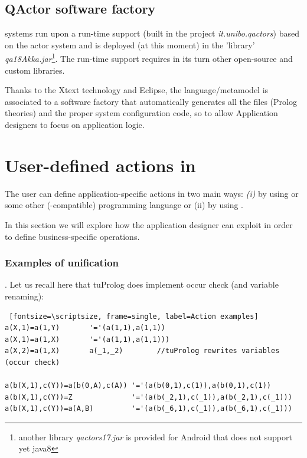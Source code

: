 \subsection{QActor software factory} 

\qa{} systems run upon a run-time support  (built in the project \textit{it.unibo.qactors}) based on the \akka{} actor system and is deployed (at this moment) in the 'library' \textit{qa18Akka.jar}\footnote{another library \textit{qactors17.jar} is provided for Android that does not support yet java8}. The \qa{} run-time support requires in its turn other open-source and custom libraries. 

Thanks to the Xtext technology and Eclipse, the \qa{} language/metamodel is associated to a software factory that automatically generates all the files (Prolog theories) and the proper system configuration code, so to allow Application designers to focus on application logic.


\newpage 


\newpage 
 \section{User-defined actions in \prolog}
 
The user can define application-specific actions in two main ways: \textit{(i)} by using \java{} or some other (\java{}-compatible) programming language or (ii) by using \tuprolog{}.
 
In this section we will explore how the application designer can exploit \tuprolog{} in order to define business-specific operations.

\subsubsection{Examples of unification}.
Let us recall here that tuProlog does implement occur check (and variable renaming):

\begin{Verbatim} [fontsize=\scriptsize, frame=single, label=Action examples]
a(X,1)=a(1,Y)       '='(a(1,1),a(1,1))
a(X,1)=a(1,X)       '='(a(1,1),a(1,1)))
a(X,2)=a(1,X)       a(_1,_2)		//tuProlog rewrites variables (occur check)

a(b(X,1),c(Y))=a(b(0,A),c(A)) '='(a(b(0,1),c(1)),a(b(0,1),c(1))
a(b(X,1),c(Y))=Z              '='(a(b(_2,1),c(_1)),a(b(_2,1),c(_1)))
a(b(X,1),c(Y))=a(A,B)         '='(a(b(_6,1),c(_1)),a(b(_6,1),c(_1)))
\end{Verbatim}

